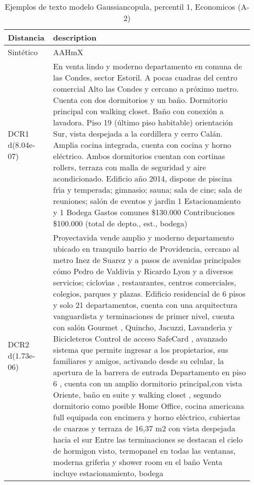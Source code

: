 \begin{table}[H]
\centering
\fontsize{10}{14}\selectfont
\caption{Ejemplos de texto modelo Gaussiancopula, percentil 1, Economicos (A-2)}
\label{table-example-economicos-a-2-gaussiancopula-1p-text}
\begin{tabular}{|l|m{35em}|}
\hline
\rowcolor[gray]{0.8}
Distancia & description \\
\hline Sintético & AAHmX \\
\hline DCR1 d(8.04e-07) & En venta lindo y moderno departamento en comuna de las Condes, sector Estoril. A pocas cuadras del centro comercial Alto las Condes y cercano a pr\'oximo metro. Cuenta con dos dormitorios y un ba\~no. Dormitorio principal con walking closet. Ba\~no con conexi\'on a lavadora. Piso 19 (\'ultimo piso habitable) orientaci\'on Sur, vista despejada a la cordillera y cerro Cal\'an. Amplia cocina integrada, cuenta con cocina y horno el\'ectrico. Ambos dormitorios cuentan con cortinas rollers, terraza con malla de seguridad y aire acondicionado. Edificio a\~no 2014, dispone de piscina fr{\'\i}a y temperada; gimnasio; sauna; sala de cine; sala de reuniones; sal\'on de eventos y jard{\'\i}n 1 Estacionamiento y 1 Bodega Gastos comunes \$130.000 Contribuciones \$100.000 (total de depto., est., bodega) \\
\hline DCR2 d(1.73e-06) & Proyectavida vende amplio y moderno departamento ubicado en tranquilo barrio de Providencia, cercano al metro Inez de Suarez y a pasos de avenidas principales c\'omo Pedro de Valdivia y Ricardo Lyon y a diversos servicios; ciclov{\'\i}as , restaurantes, centros comerciales, colegios, parques y plazas.  Edificio residencial de 6 pisos y solo 21 departamentos, cuenta con una arquitectura vanguardista y terminaciones de primer nivel, cuenta con sal\'on Gourmet , Quincho, Jacuzzi, Lavander{\'\i}a y Bicicleteros  Control de acceso SafeCard , avanzado sistema que permite ingresar a los propietarios, sus familiares y amigos, activando desde su celular, la apertura de la barrera de entrada  Departamento en piso 6 , cuenta con un amplio dormitorio principal,con vista Oriente, ba\~no en suite y walking closet , segundo dormitorio como posible Home Office, cocina americana full equipada con encimera y horno el\'ectrico, cubiertas de cuarzos y terraza de 16,37 m2 con vista despejada hacia el sur  Entre las terminaciones se destacan el cielo de hormigon visto, termopanel en todas las ventanas, moderna grifer{\'\i}a y shower room en el ba\~no  Venta incluye estacionamiento, bodega \\
\hline
\end{tabular}
\end{table}
